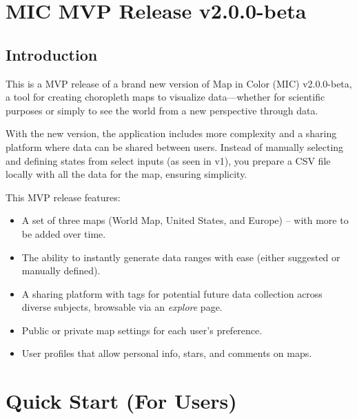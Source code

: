 \documentclass{article}
\title{}
\author{}
\date{} %
\begin{document}
\maketitle

\section{MIC MVP Release v2.0.0-beta}

\subsection{Introduction}
This is a MVP release of a brand new version of Map in Color (MIC) v2.0.0-beta,
a tool for creating choropleth maps to visualize data---whether for scientific 
purposes or simply to see the world from a new perspective through data.

With the new version, the application includes more complexity and a sharing platform 
where data can be shared between users. Instead of manually selecting and defining 
states from select inputs (as seen in v1), you prepare a CSV file locally with all 
the data for the map, ensuring simplicity.

This MVP release features:
\begin{itemize}
  \item A set of three maps (World Map, United States, and Europe) -- with 
    more to be added over time.
  \item The ability to instantly generate data ranges with ease (either 
    suggested or manually defined).
  \item A sharing platform with tags for potential future data collection 
    across diverse subjects, browsable via an \emph{explore} page.
  \item Public or private map settings for each user’s preference.
  \item User profiles that allow personal info, stars, 
    and comments on maps.
\end{itemize}

\section{Quick Start (For Users)}
\end{document}
